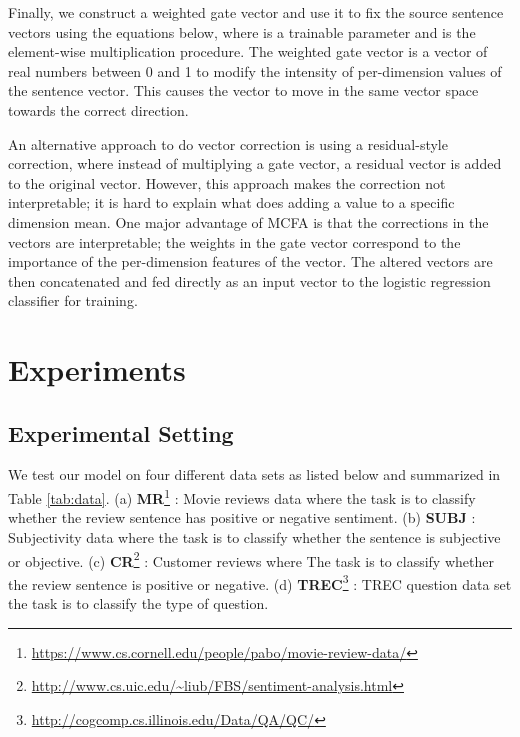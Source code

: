 \documentclass{article}
\begin{document}
Finally, we construct a weighted gate vector  and use it to fix the source sentence vectors using the equations below, where  is a trainable parameter and  is the element-wise multiplication procedure. The weighted gate vector is a vector of real numbers between 0 and 1 to modify the intensity of per-dimension values of the sentence vector.
This causes the vector to move in the same vector space towards the correct direction.


An alternative approach to do vector correction is using a residual-style correction, where instead of multiplying a gate vector, a residual vector \cite{he2016deep} is added to the original vector. However, this approach makes the correction not interpretable; it is hard to explain what does adding a value to a specific dimension mean.
One major advantage of MCFA is that the corrections in the vectors are interpretable; the weights in the gate vector correspond to the importance of the per-dimension features of the vector.
The altered vectors  are then concatenated and fed directly as an input vector to the logistic regression classifier for training.

\section{Experiments}



\subsection{Experimental Setting}

We test our model on four different data sets as listed below and summarized
in Table \ref{tab:data}.
(a) \textbf{MR}\footnote{\url{https://www.cs.cornell.edu/people/pabo/movie-review-data/}} \cite{pang2005seeing}: 
Movie reviews data where the task is to classify whether the review sentence has positive or negative sentiment.
(b) \textbf{SUBJ} \cite{pang2004sentimental}: Subjectivity data where the task is to classify whether the sentence is subjective or objective.
(c) \textbf{CR}\footnote{\url{http://www.cs.uic.edu/~liub/FBS/sentiment-analysis.html}} \cite{hu2004mining}: Customer reviews where
The task is to classify whether the review sentence is positive or negative.
(d) \textbf{TREC}\footnote{\url{http://cogcomp.cs.illinois.edu/Data/QA/QC/}} \cite{li2002learning}: TREC question data set 
the task is to classify the type of question.
\end{document}
